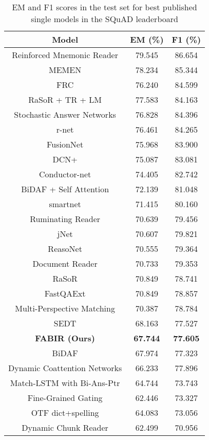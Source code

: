 \documentclass[conference, letterpaper, 10pt]{IEEEtran}
\begin{document}
\begin{table}[!htb]
    \centering
    \caption{EM and F1 scores in the test set for best published single models in the SQuAD leaderboard \cite{squad-website}}
    \begin{tabular}{| c || c | c |}
        \hline
        Model & EM (\%) & F1 (\%) \\ [0.5ex]
        \hline
        \hline
        Reinforced Mnemonic Reader \cite{Hu2017} & 79.545 &	86.654\\
        MEMEN \cite{PanLZCCH17} & 78.234 & 85.344 \\ FRC \cite{anony-nonRNN} & 76.240 & 84.599\\
        RaSoR + TR + LM  \cite{Salant2017} & 77.583 & 84.163 \\
        Stochastic Answer Networks  \cite{Xiaodong2017} & 76.828 & 84.396 \\
        r-net \cite{Yang2017} & 76.461 & 84.265 \\
        FusionNet \cite{Hsin2017} & 75.968 & 83.900 \\ DCN+ \cite{DBLP:journals/corr/abs-1711-00106}& 75.087 & 83.081\\
        Conductor-net \cite{RiuLiu2017} & 74.405 & 82.742 \\
        BiDAF + Self Attention \cite{bidaf+self-att}& 72.139 & 81.048\\
        smartnet \cite{Zhequian2017} & 71.415 & 80.160 \\
        Ruminating Reader \cite{DBLP:journals/corr/GongB17} & 70.639 & 79.456 \\
        jNet \cite{DBLP:journals/corr/ZhangZCDWJ17} &    70.607 &    79.821\\
ReasoNet \cite{DBLP:journals/corr/ShenHGC16}&	70.555 & 79.364 \\
Document Reader \cite{Chen2017} &70.733	&79.353\\
RaSoR \cite{DBLP:journals/corr/LeeKP016} &70.849 &	78.741\\
FastQAExt \cite{DBLP:journals/corr/WeissenbornWS17}&	70.849 &	78.857\\
        Multi-Perspective Matching \cite{DBLP:journals/corr/WangMHF16}&    70.387 &    78.784\\
                SEDT \cite{DBLP:journals/corr/LiuHWYN17} &    68.163&    77.527\\


        \textbf{FABIR (Ours)} & \textbf{67.744}
        &\textbf{77.605}\\ 
                BiDAF \cite{Seo2016} & 67.974 & 77.323 \\
                Dynamic Coattention Networks \cite{Xiong2016} & 66.233 & 77.896 \\
        Match-LSTM with Bi-Ans-Ptr \cite{Wang16} & 64.744 &	73.743\\
        Fine-Grained Gating \cite{DBLP:journals/corr/YangDYHCS16} &	62.446	& 73.327\\
        OTF dict+spelling \cite{DBLP:journals/corr/BahdanauBJGVB17} &	64.083	& 73.056\\
Dynamic Chunk Reader \cite{DBLP:journals/corr/YuZHYXZ16}&62.499&	70.956\\


\end{tabular}
\end{table}
\end{document}
